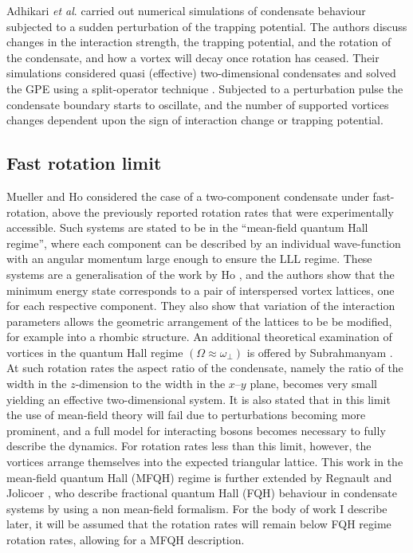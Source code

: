 Adhikari \textit{et al}. \cite{BEC:Adhikari_pra_2002} carried out numerical simulations of condensate behaviour subjected to a sudden perturbation of the trapping potential. The authors discuss changes in the interaction strength, the trapping potential, and the rotation of the condensate, and how a vortex will decay once rotation has ceased. Their simulations considered quasi (effective) two-dimensional condensates and solved the GPE using a split-operator technique \cite{BEC:Javanainen_jphysa_2006}. Subjected to a perturbation pulse the condensate boundary starts to oscillate, and the number of supported vortices changes dependent upon the sign of interaction change or trapping potential.

\subsection{Fast rotation limit}
Mueller and Ho \cite{Vtx:Mueller_prl_2002} considered the case of a two-component condensate under fast-rotation, above the previously reported rotation rates that were experimentally accessible. Such systems are stated to be in the ``mean-field quantum Hall regime'', where each component can be described by an individual wave-function with an angular momentum large enough to ensure the LLL regime. These systems are a generalisation of the work by Ho \cite{Vtx:Ho_prl_2001}, and the authors show that the minimum energy state corresponds to a pair of interspersed vortex lattices, one for each respective component. They also show that variation of the interaction parameters allows the geometric arrangement of the lattices to be be modified, for example into a rhombic structure. An additional theoretical examination of vortices in the quantum Hall regime $(\Omega\approx\omega_{\perp})$ is offered by Subrahmanyam \cite{Vtx:Subrahmanyam_pra_2003}. At such rotation rates the aspect ratio of the condensate, namely the ratio of the width in the $z$-dimension to the width in the $x$--$y$ plane, becomes very small yielding an effective two-dimensional system.
It is also stated that in this limit the use of mean-field theory will fail due to perturbations becoming more prominent, and a full model for interacting bosons becomes necessary to fully describe the dynamics. For rotation rates less than this limit, however, the vortices arrange themselves into the expected triangular lattice. This work in the mean-field quantum Hall (MFQH) regime is further extended by Regnault and Jolicoer \cite{Vtx:Regnault_prl_2003}, who describe fractional quantum Hall (FQH) behaviour in condensate systems by using a non mean-field formalism. For the body of work I describe later, it will be assumed that the rotation rates will remain below FQH regime rotation rates, allowing for a MFQH description.

